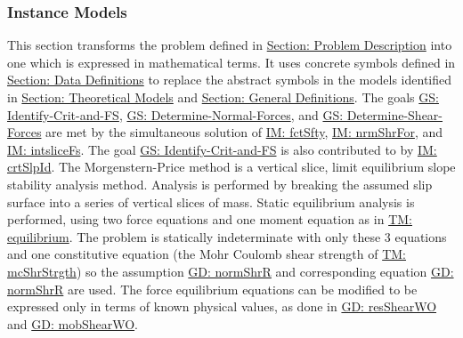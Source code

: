 \documentclass[12pt]{article}
\begin{document}
\subsubsection{Instance Models}
\label{Sec:IMs}
This section transforms the problem defined in \hyperref[Sec:ProbDesc]{Section: Problem Description} into one which is expressed in mathematical terms. It uses concrete symbols defined in \hyperref[Sec:DDs]{Section: Data Definitions} to replace the abstract symbols in the models identified in \hyperref[Sec:TMs]{Section: Theoretical Models} and \hyperref[Sec:GDs]{Section: General Definitions}.
The goals \hyperref[identifyCritAndFS]{GS: Identify-Crit-and-FS}, \hyperref[determineNormalF]{GS: Determine-Normal-Forces}, and \hyperref[determineShearF]{GS: Determine-Shear-Forces} are met by the simultaneous solution of \hyperref[IM:fctSfty]{IM: fctSfty}, \hyperref[IM:nrmShrFor]{IM: nrmShrFor}, and \hyperref[IM:intsliceFs]{IM: intsliceFs}. The goal \hyperref[identifyCritAndFS]{GS: Identify-Crit-and-FS} is also contributed to by \hyperref[IM:crtSlpId]{IM: crtSlpId}.
The Morgenstern-Price method is a vertical slice, limit equilibrium slope stability analysis method. Analysis is performed by breaking the assumed slip surface into a series of vertical slices of mass. Static equilibrium analysis is performed, using two force equations and one moment equation as in \hyperref[TM:equilibrium]{TM: equilibrium}. The problem is statically indeterminate with only these 3 equations and one constitutive equation (the Mohr Coulomb shear strength of \hyperref[TM:mcShrStrgth]{TM: mcShrStrgth}) so the assumption \hyperref[GD:normShrR]{GD: normShrR} and corresponding equation \hyperref[GD:normShrR]{GD: normShrR} are used. The force equilibrium equations can be modified to be expressed only in terms of known physical values, as done in \hyperref[GD:resShearWO]{GD: resShearWO} and \hyperref[GD:mobShearWO]{GD: mobShearWO}.
\par~
\end{document}

